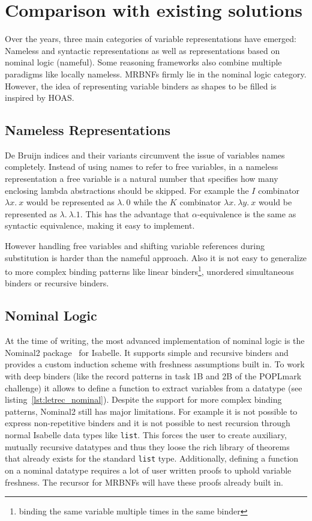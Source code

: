 \chapter{Comparison with existing solutions}\label{chapter:comparison}

Over the years, three main categories of variable representations have emerged: Nameless and syntactic representations as well as representations based on nominal logic\cite{nominal_logic} (nameful). Some reasoning frameworks also combine multiple paradigms like locally nameless\cite{locally_nameless}. \acp{MRBNF} firmly lie in the nominal logic category. However, the idea of representing variable binders as shapes to be filled is inspired by \ac{HOAS}.

\section{Nameless Representations}

De Bruijn indices\cite{deBruijn} and their variants circumvent the issue of variables names completely. Instead of using names to refer to free variables, in a nameless representation a free variable is a natural number that specifies how many enclosing lambda abstractions should be skipped. For example the $I$ combinator $\lambda x. \: x$ would be represented as $\lambda. \: 0$ while the $K$ combinator $\lambda x. \: \lambda y. \: x$ would be represented as $\lambda. \: \lambda. 1$. This has the advantage that $\alpha$-equivalence is the same as syntactic equivalence, making it easy to implement.

However handling free variables and shifting variable references during substitution is harder than the nameful approach. Also it is not easy to generalize to more complex binding patterns like linear binders\footnote{binding the same variable multiple times in the same binder}, unordered simultaneous binders or recursive binders.

\section{Nominal Logic}

At the time of writing, the most advanced implementation of nominal logic is the Nominal2 package~\cite{nominal2} for Isabelle. It supports simple and recursive binders and provides a custom induction scheme with freshness assumptions built in. To work with deep binders (like the record patterns in task 1B and 2B of the POPLmark challenge) it allows to define a function to extract variables from a datatype (see listing~\ref{lst:letrec_nominal}). Despite the support for more complex binding patterns, Nominal2 still has major limitations. For example it is not possible to express non-repetitive binders and it is not possible to nest recursion through normal Isabelle data types like \texttt{list}. This forces the user to create auxiliary, mutually recursive datatypes and thus they loose the rich library of theorems that already exists for the standard \texttt{list} type. Additionally, defining a function on a nominal datatype requires a lot of user written proofs to uphold variable freshness. The recursor for \acp{MRBNF} will have these proofs already built in.

